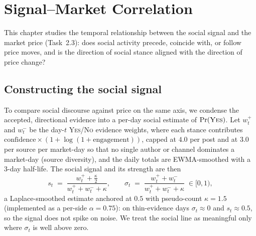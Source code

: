 \chapter{Signal--Market Correlation}
\label{ch:correlation}

This chapter studies the temporal relationship between the social signal and the market
price (Task~2.3): does social activity precede, coincide with, or follow price moves,
and is the direction of social stance aligned with the direction of price change?

\section{Constructing the social signal}
\label{sec:spi-signal}
To compare social discourse against price on the same axis, we condense the accepted,
directional evidence into a per-day social estimate of $\Pr(\textsc{Yes})$. Let
$w^{+}_t$ and $w^{-}_t$ be the day-$t$ \textsc{Yes}/\textsc{No} evidence weights, where
each stance contributes $\text{confidence}\times(1+\log(1+\text{engagement}))$, capped
at $4.0$ per post and at $3.0$ per source per market-day so that no single author or
channel dominates a market-day (source diversity), and the
daily totals are EWMA-smoothed with a 3-day half-life. The social signal and its
strength are then
\begin{equation}
s_t \;=\; \frac{w^{+}_t + \tfrac{\kappa}{2}}{w^{+}_t + w^{-}_t + \kappa},
\qquad
\sigma_t \;=\; \frac{w^{+}_t + w^{-}_t}{w^{+}_t + w^{-}_t + \kappa}\;\in[0,1),
\label{eq:signal}
\end{equation}
a Laplace-smoothed estimate anchored at $0.5$ with pseudo-count $\kappa=1.5$
(implemented as a per-side $\alpha=0.75$): on thin-evidence days $\sigma_t\!\approx\!0$
and $s_t\!\approx\!0.5$, so the signal does not spike on noise. We treat the social line
as meaningful only where $\sigma_t$ is well above zero.


